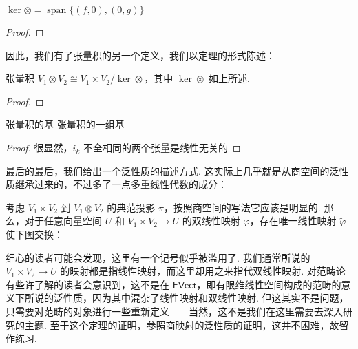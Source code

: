 \begin{lemma}{}{}
    $\ker \otimes = \mathop{\mathrm{span}}\{(f,0), (0, g)\}$
\end{lemma}
\begin{proof}

\end{proof}

因此，我们有了张量积的另一个定义，我们以定理的形式陈述：

\begin{theorem}{}{}
    张量积 $V_1 \otimes V_2 \cong V_1 \times V_2 / \ker \otimes$，其中 $\ker \otimes$ 如上所述.
\end{theorem}
\begin{proof}

\end{proof}

\begin{theorem}{}{张量积的基}
    张量积的一组基
\end{theorem}
\begin{proof}
    很显然，$i_k$ 不全相同的两个张量是线性无关的
\end{proof}

最后的最后，我们给出一个泛性质的描述方式. 这实际上几乎就是从商空间的泛性质继承过来的，不过多了一点多重线性代数的成分：

\begin{theorem}{}{}
    考虑 $V_1 \times V_2$ 到 $V_1 \otimes V_2$ 的典范投影 $\pi$，按照商空间的写法它应该是明显的. 那么，对于任意向量空间 $U$ 和 $V_1 \times V_2 \to U$ 的双线性映射 $\varphi$，存在唯一线性映射 $\tilde \varphi$ 使下图交换：
    \begin{center}
    \end{center}
\end{theorem}

细心的读者可能会发现，这里有一个记号似乎被滥用了. 我们通常所说的 $V_1 \times V_2 \to U$ 的映射都是指线性映射，而这里却用之来指代双线性映射. 对范畴论有些许了解的读者会意识到，这不是在 $\mathsf{FVect}$，即有限维线性空间构成的范畴的意义下所说的泛性质，因为其中混杂了线性映射和双线性映射. 但这其实不是问题，只需要对范畴的对象进行一些重新定义——当然，这不是我们在这里需要去深入研究的主题. 至于这个定理的证明，参照商映射的泛性质的证明，这并不困难，故留作练习.


